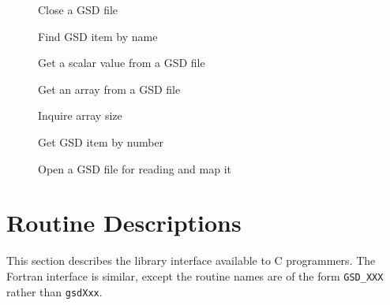 \documentclass[oneside,11pt]{starlink}
\begin{document}
\begin{description}
\item[] \mbox{}

Close a GSD file

\item[] \mbox{}

Find GSD item by name

\item[] \mbox{}

Get a scalar value from a GSD file

\item[] \mbox{}

Get an array from a GSD file

\item[] \mbox{}

Inquire array size

\item[] \mbox{}

Get GSD item by number

\item[] \mbox{}

Open a GSD file for reading and map it

\end{description}


\section{Routine Descriptions\label{app:desc}}

This section describes the library interface available to C programmers.
The Fortran interface is similar, except the routine names are of the
form \texttt{GSD\_XXX} rather than \texttt{gsdXxx}.
\end{document}
